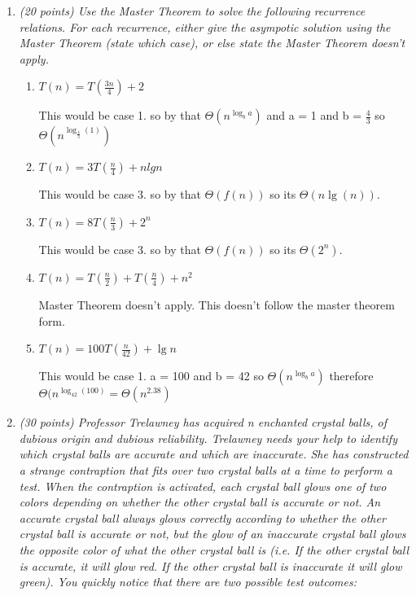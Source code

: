 \documentclass[12pt]{article}
\begin{document}
\begin{enumerate}
    \newpage

    \item\textit{
    (20 points) Use the Master Theorem to solve the following recurrence relations. For each recurrence, either give the asympotic solution using the Master Theorem (state which case), or else state the Master Theorem doesn't apply.}
    \begin{enumerate}
    	\item\textit{ $T(n) = T(\frac{3n}{4}) + 2$}

	This would be case 1. so by that $\Theta(n^{\log_ba})$ and a = 1 and b = $\frac{4}{3}$ so $\Theta(n^{\log_\frac{4}{3}(1)})$
    	\item\textit{ $T(n) = 3T(\frac{n}{4}) + nlgn$}

	This would be case 3. so by that $\Theta(f(n))$ so its $\Theta(n\lg(n))$.
    	\item\textit{ $T(n) = 8T(\frac{n}{3}) + 2^n$}

	This would be case 3. so by that $\Theta(f(n))$ so its $\Theta(2^n)$.
    	\item\textit{ $T(n) = T(\frac{n}{2}) + T(\frac{n}{4}) + n^2$}
	
	Master Theorem doesn't apply. This doesn't follow the master theorem form.
    	\item\textit{ $T(n) = 100T(\frac{n}{42}) + \lg n$}

	This would be case 1. a = 100 and b = 42 so $\Theta(n^{\log_ba})$ therefore $\Theta(n^{\log_{42}(100)} = \Theta(n^{2.38})$
	\end{enumerate} 

    \newpage

	\item \textit{(30 points)
	Professor Trelawney has acquired \textit{n} enchanted crystal balls, of dubious origin and dubious reliability. Trelawney needs your help to identify which crystal balls are accurate and which are inaccurate. She has constructed a strange contraption that fits over two crystal balls at a time to perform a test. When the contraption is activated, each crystal ball glows one of two colors depending on whether the other crystal ball is accurate or not. An accurate crystal ball always glows correctly according to whether the other crystal ball is accurate or not, but the glow of an inaccurate crystal ball glows the opposite color of what the other crystal ball is (i.e. If the other crystal ball is accurate, it will glow red. If the other crystal ball is inaccurate it will glow green). You quickly notice that there are two possible test outcomes:}


\end{enumerate}
\end{document}
